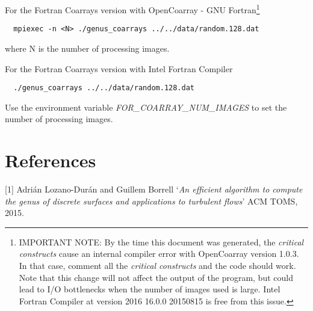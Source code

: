 \documentclass[a4paper,10pt]{article}
\begin{document}
For the Fortran Coarrays version with OpenCoarray - GNU
Fortran\footnote{IMPORTANT NOTE: By the time this document was
  generated, the \emph{critical constructs} cause an internal compiler
  error with OpenCoarray version 1.0.3. In that case, comment all the
  \emph{critical constructs} and the code should work. Note that this
  change will not affect the output of the program, but could lead to
  I/O bottlenecks when the number of images used is large. Intel
  Fortran Compiler at version 2016 16.0.0 20150815 is free from this
  issue.}
\begin{verbatim}
  mpiexec -n <N> ./genus_coarrays ../../data/random.128.dat
\end{verbatim}
where N is the number of processing images.

For the Fortran Coarrays version with
Intel\textsuperscript{\textregistered} Fortran Compiler
\begin{verbatim}
  ./genus_coarrays ../../data/random.128.dat
\end{verbatim}
Use the environment variable \emph{FOR\_COARRAY\_NUM\_IMAGES} to set
the number of processing images.

\section{References}
[1] Adri\'an Lozano-Dur\'an and Guillem Borrell `\emph{An efficient
  algorithm to compute the genus of discrete surfaces and applications
  to turbulent flows}' ACM TOMS, 2015.
\end{document}
